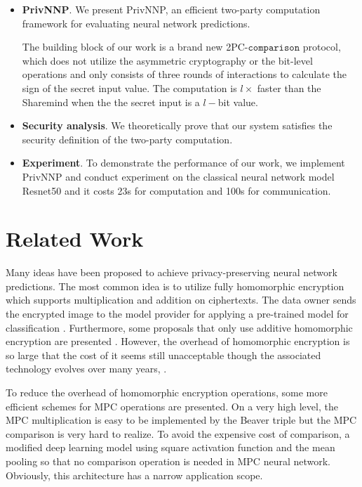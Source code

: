 \documentclass[letterpaper]{article} %
\begin{document}
    \begin{itemize}
        \item \textbf{PrivNNP}.
        We present PrivNNP, an efficient two-party computation framework
        for evaluating neural network predictions.

        The building block of our work is a brand new 2PC-$\mathtt{comparison}$ protocol,
        which does not utilize the asymmetric cryptography or the bit-level operations
        and only consists of three rounds of interactions to calculate the sign of the secret input value.
        The computation is $l\times$ faster than the Sharemind \cite{Sharemind}
        when the the secret input is a $l-$bit value.
        \item \textbf{Security analysis}.
        We theoretically prove that our system satisfies the
        security definition of the two-party computation.

        \item \textbf{Experiment}.
        To demonstrate the performance of our work,
        we implement PrivNNP and conduct experiment on the classical
        neural network model Resnet50 and
        it costs 23s for computation and 100s for communication.

   \end{itemize}

\section{Related Work}
    Many ideas have been proposed to achieve privacy-preserving neural network predictions.
    The most common idea is to utilize fully homomorphic encryption  \cite{SEAL} \cite{Homomorphic1}
    which supports multiplication and addition on ciphertexts.
    The data owner sends the encrypted image to the model provider for applying a pre-trained model for classification \cite{FullyHomomorphic}.
    Furthermore, some proposals that only use additive homomorphic encryption are presented \cite{Homomorphic2}.
    However, the overhead of homomorphic encryption is so large that
    the cost of it seems still unacceptable
    though the associated technology evolves over many years\cite{ObliviousNeuralNetwork}, .

    To reduce the overhead of homomorphic encryption operations,
    some more efficient schemes for MPC operations are presented.
    On a very high level, the MPC multiplication is easy to be implemented by the Beaver triple \cite{EfficientMultipartyProtocols}
    but the MPC comparison is very hard to realize.
    To avoid the expensive cost of comparison,
    a modified deep learning model \cite{CryptoNets} using square activation function and the mean pooling so that
    no comparison operation is needed in MPC neural network.
    Obviously, this architecture has a narrow application scope.
\end{document}
